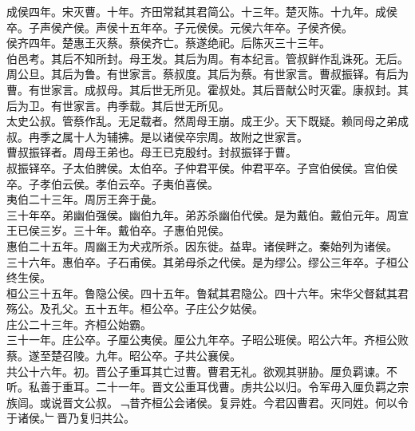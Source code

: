 \documentclass{zhvt-classic}
\begin{document}
\hspace*{2em}成侯四年。宋灭曹。十年。齐田常弑其君简公。十三年。楚灭陈。十九年。成侯卒。子声侯产侯。声侯十五年卒。子元侯侯。元侯六年卒。子侯齐侯。\\
\hspace*{2em}侯齐四年。楚惠王灭蔡。蔡侯齐亡。蔡遂绝祀。后陈灭三十三年。\\
\hspace*{2em}伯邑考。其后不知所封。母王发。其后为周。有本纪言。管叔鲜作乱诛死。无后。周公旦。其后为鲁。有世家言。蔡叔度。其后为蔡。有世家言。曹叔振铎。有后为曹。有世家言。成叔母。其后世无所见。霍叔处。其后晋献公时灭霍。康叔封。其后为卫。有世家言。冉季载。其后世无所见。\\
\hspace*{2em}太史公叔。管蔡作乱。无足载者。然周母王崩。成王少。天下既疑。赖同母之弟成叔。冉季之属十人为辅拂。是以诸侯卒宗周。故附之世家言。\\
\hspace*{2em}曹叔振铎者。周母王弟也。母王已克殷纣。封叔振铎于曹。\\
\hspace*{2em}叔振铎卒。子太伯脾侯。太伯卒。子仲君平侯。仲君平卒。子宫伯侯侯。宫伯侯卒。子孝伯云侯。孝伯云卒。子夷伯喜侯。\\
\hspace*{2em}夷伯二十三年。周厉王奔于彘。\\
\hspace*{2em}三十年卒。弟幽伯强侯。幽伯九年。弟苏杀幽伯代侯。是为戴伯。戴伯元年。周宣王已侯三岁。三十年。戴伯卒。子惠伯兕侯。\\
\hspace*{2em}惠伯二十五年。周幽王为犬戎所杀。因东徙。益卑。诸侯畔之。秦始列为诸侯。\\
\hspace*{2em}三十六年。惠伯卒。子石甫侯。其弟母杀之代侯。是为缪公。缪公三年卒。子桓公终生侯。\\
\hspace*{2em}桓公三十五年。鲁隐公侯。四十五年。鲁弑其君隐公。四十六年。宋华父督弑其君殇公。及孔父。五十五年。桓公卒。子庄公夕姑侯。\\
\hspace*{2em}庄公二十三年。齐桓公始霸。\\
\hspace*{2em}三十一年。庄公卒。子厘公夷侯。厘公九年卒。子昭公班侯。昭公六年。齐桓公败蔡。遂至楚召陵。九年。昭公卒。子共公襄侯。\\
\hspace*{2em}共公十六年。初。晋公子重耳其亡过曹。曹君无礼。欲观其骈胁。厘负羁谏。不听。私善于重耳。二十一年。晋文公重耳伐曹。虏共公以归。令军毋入厘负羁之宗族闾。或说晋文公叔。﹁昔齐桓公会诸侯。复异姓。今君囚曹君。灭同姓。何以令于诸侯。﹂晋乃复归共公。\\
\end{document}
